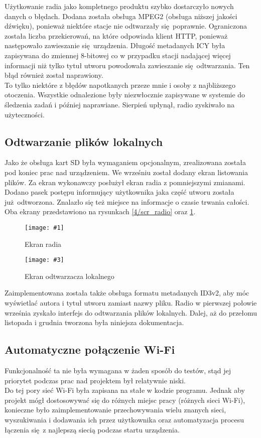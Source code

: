 \documentclass[polish]{aghengthesis}
\newcommand{\imgintss}[5]{
	\begin{figure}[{#5}]
		\centering
		\begin{minipage}{.45\textwidth}
			\centering
			\texttt{[image: \#1]}
			\caption{#2}
			\label{#1}
		\end{minipage}%
		\hfill
		\begin{minipage}{.45\textwidth}
			\centering
			\texttt{[image: \#3]}
			\caption{#4}
			\label{#3}
		\end{minipage}
	\end{figure}
}
\newcommand{\imghss}[4]{\imgintss{#1}{#2}{#3}{#4}{H}}
\begin{document}
			Użytkowanie radia jako kompletnego produktu szybko dostarczyło nowych danych o błędach. Dodana została obsługa MPEG2 (obsługa niższej jakości dźwięku), ponieważ niektóre stacje nie odtwarzały się poprawnie. Ograniczona została liczba przekierowań, na które odpowiada klient HTTP, ponieważ następowało zawieszanie się urządzenia. Długość metadanych ICY była zapisywana do zmiennej 8-bitowej co w przypadku stacji nadającej więcej informacji niż tylko tytuł utworu powodowała zawieszanie się odtwarzania. Ten błąd również został naprawiony.
			$ $\\
			
			To tylko niektóre z błędów napotkanych przeze mnie i osoby z najbliższego otoczenia. Wszystkie odnalezione były niezwłocznie zapisywane w systemie do śledzenia zadań i później naprawiane. Sierpień upłynął, radio zyskiwało na użyteczności.
			
		\subsection{Odtwarzanie plików lokalnych}
			Jako że obsługa kart SD była wymaganiem opcjonalnym, zrealizowana została pod koniec prac nad urządzeniem. We wrześniu został dodany ekran listowania plików. Za ekran wykonawczy posłużył ekran radia z pomniejszymi zmianami. Dodano pasek postępu informujący użytkownika jaka część utworu została już odtworzona. Znalazło się też miejsce na informacje o czasie trwania całości. Oba ekrany przedstawiono na rysunkach \ref{4/scr_radio} oraz \ref{4/scr_player}.
			
			\imghss{4/scr_radio}{Ekran radia}{4/scr_player}{Ekran odtwarzacza lokalnego}
			
			Zaimplementowana została także obsługa formatu metadanych ID3v2, aby móc wyświetlać autora i tytuł utworu zamiast nazwy pliku. Radio w pierwszej połowie września zyskało interfejs do odtwarzania plików lokalnych. Dalej, aż do przełomu listopada i grudnia tworzona była niniejsza dokumentacja.
			
		\subsection{Automatyczne połączenie Wi-Fi}
			Funkcjonalność ta nie była wymagana w żaden sposób do testów, stąd jej priorytet podczas prac nad projektem był relatywnie niski. 
			$ $\\

			 Do tej pory sieć Wi-Fi była zapisana na stałe w kodzie programu.  Jednak aby projekt mógł dostosowywać się do różnych miejsc pracy (różnych sieci Wi-Fi), konieczne było zaimplementowanie przechowywania wielu znanych sieci, wyszukiwania i dodawania ich przez użytkownika oraz automatyzacja procesu łączenia się z najlepszą siecią podczas startu urządzenia.
			 $ $\\
			 
\end{document}
